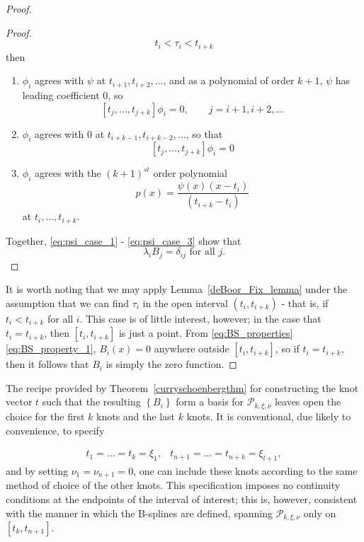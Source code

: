 \documentclass[12pt]{article}
\newcommand{\PP}{\mathcal{P}}
\theoremstyle{definition}
\begin{document}
\begin{proof}
\begin{proof}
\[
t_i < \tau_i < t_{i+k}
\]
then 
\begin{enumerate}
\item \label{eq:psi_case_1} $\phi_i$ agrees with $\psi$ at $t_{i+1},t_{i+2},\dots$, and as a polynomial of order $k+1$, $\psi$ has leading coefficient $0$, so 
\[
\left[t_j,\dots,t_{j+k}\right]\phi_i = 0, \qquad j=i+1, i+2, \dots
\]
\item \label{eq:psi_case_2} $\phi_i$ agrees with 0 at $t_{i+k-1},t_{i+k-2},\dots$, so that
\[
\left[t_j,\dots,t_{j+k}\right]\phi_i = 0
\]

\item \label{eq:psi_case_3} $\phi_i$ agrees with the $\left(k+1\right)^{st}$ order polynomial 
\[
p\left(x\right) = \frac{\psi\left(x\right)\left(x-t_i\right)}{\left(t_{i+k}-t_i\right)}
\]
at $t_i,\dots,t_{i+k}$. 
\end{enumerate}
Together, \ref{eq:psi_case_1} - \ref{eq:psi_case_3} show that 
\[
\lambda_iB_j = \delta_{ij} \mbox{ for all } j.
\] 
\end{proof}
It is worth noting that we may apply Lemma~\ref{deBoor_Fix_lemma} under the assumption that we can find $\tau_i$ in the open interval $\left(t_i,t_{i+k}\right)$ - that is, if $t_i < t_{i+k}$ for all $i$. This case is of little interest, however; in the case that $t_i = t_{i+k}$, then $\left[t_i,t_{i+k}\right]$ is just a point. From \ref{eq:BS_properties} \ref{eq:BS_property_1}, $B_i\left(x\right) = 0$ anywhere outside $\left[t_i,t_{i+k}\right]$, so if $t_i=t_{i+k}$, then it follows that $B_i$ is simply the zero function.
\end{proof}

The recipe provided by Theorem~\ref{curryschoenbergthm} for constructing the knot vector $t$ such that the resulting $\left\{B_i \right\}$ form a basis for $\PP_{k,\xi,\nu}$ leaves open the choice for the first $k$ knots and the last $k$ knots. It is conventional, due likely to convenience, to specify

\[
\begin{array}{cc}
t_1 = \dots = t_k = \xi_1, & t_{n+1} = \dots = t_{n+k} = \xi_{l+1}, 
\end{array}
\]    
and by setting $\nu_1 = \nu_{n+1} = 0$, one can include these knots according to the same method of choice of the other knots. This specification imposes no continuity conditions at the endpoints of the interval of interest; this is, however, consistent with the manner in which the B-splines are defined, spanning $\PP_{k,\xi,\nu}$ only on $\left[ t_k,t_{n+1}\right]$.
\end{document}
